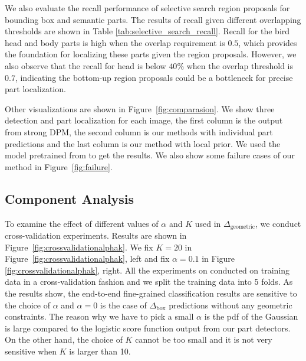 We also evaluate the recall performance of selective search region proposals \cite{selsearch} for bounding box and semantic parts. 
The results of recall given different overlapping thresholds are shown in Table \ref{tab:selective_search_recall}. 
Recall for the bird head and body parts is high when the overlap requirement is $0.5$, which provides the foundation for localizing these parts given the region proposals. However, we also observe that the recall for head is below $40\%$ when the overlap threshold is $0.7$, indicating the bottom-up region proposals could be a bottleneck for precise part localization.

Other visualizations are shown in Figure~\ref{fig:comparasion}. We show three detection and part localization for each image, the first column is the output from strong DPM, the second column is our methods with individual part predictions and the last column is our method with local prior. We used the model pretrained from \cite{Hossein_ECCV12} to get the results. We also show some failure cases of our method in Figure~\ref{fig:failure}.


\subsection{Component Analysis}
To examine the effect of different values of $\alpha$ and $K$ used in $\Delta_{\mathrm{geometric}}$, we conduct cross-validation experiments.
Results are shown in Figure~\ref{fig:crossvalidationalphak}. We fix $K=20$ in Figure~\ref{fig:crossvalidationalphak}, left and fix $\alpha = 0.1$ in Figure \ref{fig:crossvalidationalphak}, right. All the experiments on conducted on training data in a cross-validation fashion and we split the training data into 5 folds.
As the results show, the end-to-end fine-grained classification results are sensitive to the choice of $\alpha$ and $\alpha=0$ is the case of $\Delta_{\mathrm{box}}$ predictions without any geometric constraints. The reason why we have to pick a small $\alpha$ is the pdf of the Gaussian is large compared to the logistic score function output from our part detectors. On the other hand, the choice of $K$ cannot be too small and it is not very sensitive when $K$ is larger than 10. 


%



